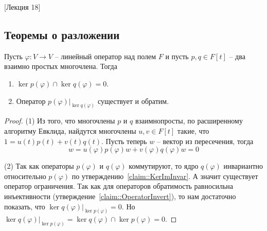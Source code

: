 [Лекция 18]


\subsection{Теоремы о разложении}

\begin{claim}
\label{claim::CoprimeKernels}
Пусть $\varphi\colon V\to V$ -- линейный оператор над полем $F$ и пусть $p,q\in F[t]$ -- два взаимно простых многочлена.
Тогда 
\begin{enumerate}
\item $\ker p(\varphi)\cap \ker q(\varphi) = 0$.

\item Оператор $p(\varphi)|_{\ker q(\varphi)}$ существует и обратим.
\end{enumerate}
\end{claim}
\begin{proof}
(1)  Из того, что многочлены $p$ и $q$ взаимнопросты, по расширенному алгоритму Евклида, найдутся многочлены $u,v\in F[t]$ такие, что $1 = u(t)p(t) + v(t)q(t)$.
Пусть теперь $w$ -- вектор из пересечения, тогда
\[
w = u(\varphi) p(\varphi) w + v(\varphi) q(\varphi) w = 0
\]

(2) Так как операторы $p(\varphi)$ и $q(\varphi)$ коммутируют, то ядро $q(\varphi)$ инвариантно относительно $p(\varphi)$ по утверждению~\ref{claim::KerImInvar}.
А значит существует оператор ограничения.
Так как для операторов обратимость равносильна инъективности (утверждение~\ref{claim::OperatorInvert}), то нам достаточно показать, что $\ker q(\varphi)|_{\ker p(\varphi)} = 0$.
Но $\ker q(\varphi)|_{\ker p(\varphi)} = \ker q(\varphi) \cap \ker p(\varphi) = 0$.
\end{proof}



